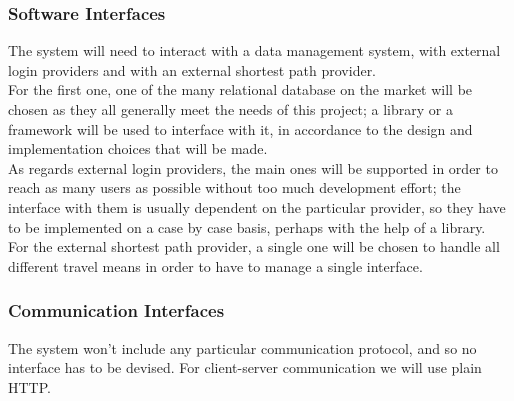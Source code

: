 \subsubsection{Software Interfaces}
The system will need to interact with a data management system, with external login providers and with an external shortest path provider.\\
For the first one, one of the many relational database on the market will be chosen as they all generally meet the needs of this project; a library or a framework will be used to interface with it, in accordance to the design and implementation choices that will be made.\\
As regards external login providers, the main ones will be supported in order to reach as many users as possible without too much development effort; the interface with them is usually dependent on the particular provider, so they have to be implemented on a case by case basis, perhaps with the help of a library.\\
For the external shortest path provider, a single one will be chosen to handle all different travel means in order to have to manage a single interface.

\subsubsection{Communication Interfaces}

The system won't include any particular communication protocol, and so no interface has to be devised. For client-server communication we will use plain HTTP.